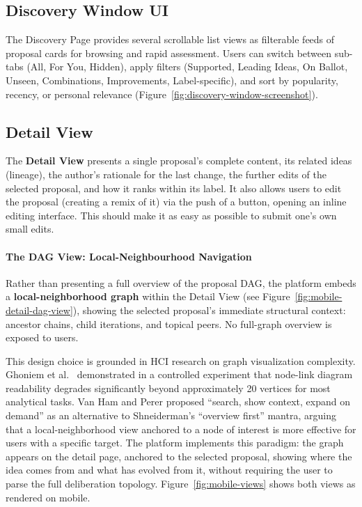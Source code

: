 \documentclass[a4paper, 12pt, twoside]{iviathesis}
\begin{document}
\subsection{Discovery Window UI}

The Discovery Page provides several scrollable list views as filterable feeds of proposal cards for browsing and rapid assessment. Users can switch between sub-tabs (All, For You, Hidden), apply filters (Supported, Leading Ideas, On Ballot, Unseen, Combinations, Improvements, Label-specific), and sort by popularity, recency, or personal relevance (Figure~\ref{fig:discovery-window-screenshot}).

\subsection{Detail View}
The \textbf{Detail View} presents a single proposal's complete content, its related ideas (lineage), the author's rationale for the last change, the further edits of the selected proposal, and how it ranks within its label. It also allows users to edit the proposal (creating a remix of it) via the push of a button, opening an inline editing interface. This should make it as easy as possible to submit one's own small edits.

\paragraph{The DAG View: Local-Neighbourhood Navigation}
\label{sec:graph-view}
Rather than presenting a full overview of the proposal DAG, the platform embeds a \textbf{local-neighborhood graph} within the Detail View (see Figure~\ref{fig:mobile-detail-dag-view}), showing the selected proposal's immediate structural context: ancestor chains, child iterations, and topical peers. No full-graph overview is exposed to users. 

This design choice is grounded in HCI research on graph visualization complexity. Ghoniem et al.\ \cite{ghoniem2005readability} demonstrated in a controlled experiment that node-link diagram readability degrades significantly beyond approximately 20 vertices for most analytical tasks. Van Ham and Perer \cite{vanham2009search} proposed ``search, show context, expand on demand'' as an alternative to Shneiderman's \cite{shneiderman1996eyes} ``overview first'' mantra, arguing that a local-neighborhood view anchored to a node of interest is more effective for users with a specific target. The platform implements this paradigm: the graph appears on the detail page, anchored to the selected proposal, showing where the idea comes from and what has evolved from it, without requiring the user to parse the full deliberation topology. Figure~\ref{fig:mobile-views} shows both views as rendered on mobile.
\end{document}
